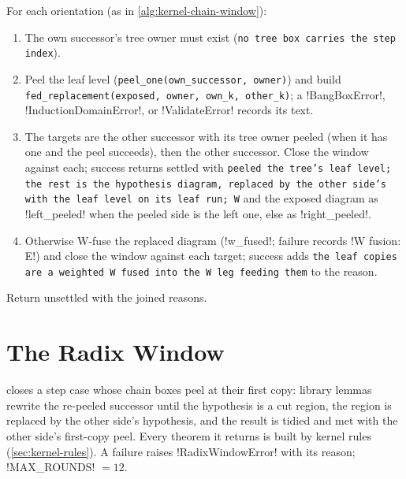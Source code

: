 \begin{algorithm}\label{alg:kernel-tree-window}
For each orientation (as in \cref{alg:kernel-chain-window}):
\begin{enumerate}
\item The own successor's tree owner must exist (\texttt{no tree box carries the step index}).
\item Peel the leaf level (\texttt{peel\_\allowbreak{}one(\allowbreak{}own\_\allowbreak{}successor,\allowbreak{} owner)}) and build \texttt{fed\_\allowbreak{}replacement(\allowbreak{}exposed,\allowbreak{} owner,\allowbreak{} own\_\allowbreak{}k,\allowbreak{} other\_\allowbreak{}k)}; a \py!BangBoxError!, \py!InductionDomainError!, or \py!ValidateError! records its text.
\item The targets are the other successor with its tree owner peeled (when it has one and the peel succeeds), then the other successor. Close the window against each; success returns settled with \texttt{peeled the tree's leaf level; the rest is the hypothesis diagram,\allowbreak{} replaced by the other side's with the leaf level on its leaf run; W} and the exposed diagram as \py!left_peeled! when the peeled side is the left one, else as \py!right_peeled!.
\item Otherwise W-fuse the replaced diagram (\py!w_fused!; failure records \code!W fusion: E!) and close the window against each target; success adds \texttt{the leaf copies are a weighted W fused into the W leg feeding them} to the reason.
\end{enumerate}
Return unsettled with the joined reasons.
\end{algorithm}

\section{The Radix Window}\label{sec:kernel-radix-window}

 closes a step case whose chain boxes peel at their first copy: library lemmas rewrite the re-peeled successor until the hypothesis is a cut region, the region is replaced by the other side's hypothesis, and the result is tidied and met with the other side's first-copy peel. Every theorem it returns is built by kernel rules (\cref{sec:kernel-rules}). A failure raises \py!RadixWindowError! with its reason; \py!MAX_ROUNDS! $=12$.


